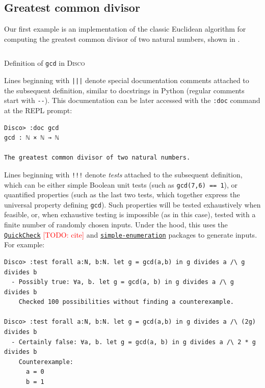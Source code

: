 \documentclass[submission,copyright,creativecommons]{eptcs}
\newcommand{\disco}{\textsc{Disco}\xspace}
\newcommand{\pkg}[1]{\href{https://hackage.haskell.org/package/#1}{\texttt{#1}}}
\newcommand{\pref}[1]{\prettyref{#1}}
\newcommand{\todo}[1]{\textcolor{red}{[TODO: #1]}}
\newcommand{\todo}[1]{}
\begin{document}
\subsection{Greatest common divisor}
\label{sec:gcd}

Our first example is an implementation of the classic Euclidean
algorithm for computing the greatest common divisor of two natural
numbers, shown in \pref{lst:gcd}.

\begin{listing}[!htp]
\inputminted{text}{examples/gcd.disco}
\caption{Definition of \texttt{gcd} in \disco}
\label{lst:gcd}
\end{listing}

Lines beginning with \texttt{|||} denote special documentation
comments attached to the subsequent definition, similar to docstrings
in Python (regular comments start with \texttt{-{}-}).  This
documentation can be later accessed with the \texttt{:doc} command at
the REPL prompt:

\begin{verbatim}
Disco> :doc gcd
gcd : ℕ × ℕ → ℕ

The greatest common divisor of two natural numbers.

\end{verbatim}

Lines beginning with \texttt{!!!} denote \emph{tests} attached to the
subsequent definition, which can be either simple Boolean unit tests
(such as \verb|gcd(7,6) == 1|), or quantified properties (such as the
last two tests, which together express the universal property defining
\verb|gcd|).  Such properties will be tested exhaustively when
feasible, or, when exhaustive testing is impossible (as in this case),
tested with a finite number of randomly chosen inputs. Under the hood,
this uses the \pkg{QuickCheck} \todo{cite} and
\pkg{simple-enumeration} packages to generate inputs.  For example:

\begin{verbatim}
Disco> :test forall a:N, b:N. let g = gcd(a,b) in g divides a /\ g divides b
  - Possibly true: ∀a, b. let g = gcd(a, b) in g divides a /\ g divides b
    Checked 100 possibilities without finding a counterexample.

Disco> :test forall a:N, b:N. let g = gcd(a,b) in g divides a /\ (2g) divides b
  - Certainly false: ∀a, b. let g = gcd(a, b) in g divides a /\ 2 * g divides b
    Counterexample:
      a = 0
      b = 1
\end{verbatim}
\end{document}
